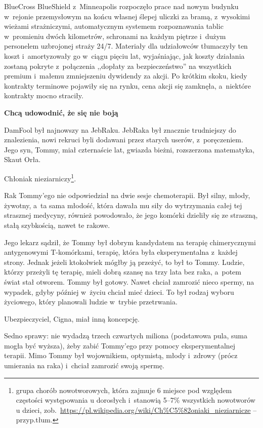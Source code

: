 \documentclass[oneside,polish,11pt,sfheadings]{mwbk}
\begin{document}
BlueCross BlueShield z~Minneapolis rozpoczęło prace nad nowym budynku w~rejonie przemysłowym na końcu własnej ślepej uliczki za bramą, z~wysokimi wieżami strażniczymi, automatycznym systemem rozpoznawania
tablic w~promieniu dwóch kilometrów, schronami na każdym piętrze i~dużym
personelem uzbrojonej straży 24/7. Materiały dla udziałowców tłumaczyły
ten koszt i~amortyzowały go w~ciągu pięciu lat, wyjaśniając, jak koszty
działania zostaną pokryte z~połączenia ,,dopłaty za bezpieczeństwo'' na
wszystkich premium i~małemu zmniejszeniu dywidendy za akcji. Po krótkim
skoku, kiedy kontrakty terminowe pojawiły się na rynku, cena akcji się
zamknęła, a~niektóre kontrakty mocno straciły.

\textbf{ Chcą udowodnić, że się nie boją}

DamFool był najnowszy na JebRaku. JebRaka był znacznie trudniejszy do
znalezienia, nowi rekruci byli dodawani przez starych userów, z~poręczeniem. Jego syn, Tommy, miał czternaście lat, gwiazda bieżni,
rozszerzona matematyka, Skaut Orła.

Chłoniak nieziarniczy\footnote{ grupa chorób nowotworowych, która zajmuje 6
miejsce pod względem częstości występowania u dorosłych i~stanowią
5--7\% wszystkich nowotworów u dzieci,
zob.~\url{https://pl.wikipedia.org/wiki/Ch\%C5\%82oniaki\_nieziarnicze}
-- przyp.tłum.}.

Rak Tommy'ego nie odpowiedział na dwie sesje chemoterapii. Był silny,
młody, żywotny, a~ta sama młodość, która dawała mu siły do wytrzymania
całej tej strasznej medycyny, również powodowało, że jego komórki
dzieliły się ze straszną, stałą szybkością, nawet te rakowe.

Jego lekarz sądził, że Tommy był dobrym kandydatem na terapię
chimerycznymi antygenowymi T-komórkami, terapię, która była
eksperymentalna z~każdej strony. Jednak jeżeli ktokolwiek mógłby ją
przeżyć, to był to Tommy. Ludzie, którzy przeżyli tę terapię, mieli
dobrą szansę na trzy lata bez raka, a~potem świat stał otworem. Tommy
był gotowy. Nawet chciał zamrozić nieco spermy, na wypadek, gdyby
później w~życiu chciał mieć dzieci. To był rodzaj wyboru życiowego,
który planowali ludzie w~trybie przetrwania.

Ubezpieczyciel, Cigna, miał inną koncepcję.

Sedno sprawy: nie wydadzą trzech czwartych miliona (podstawowa pula,
suma mogła być wyższa), żeby zabić Tommy'ego przy pomocy
eksperymentalnej terapii. Mimo Tommy był wojownikiem, optymistą, młody i~zdrowy (prócz umierania na raka) i~chciał zamrozić swoją spermę.
\end{document}
